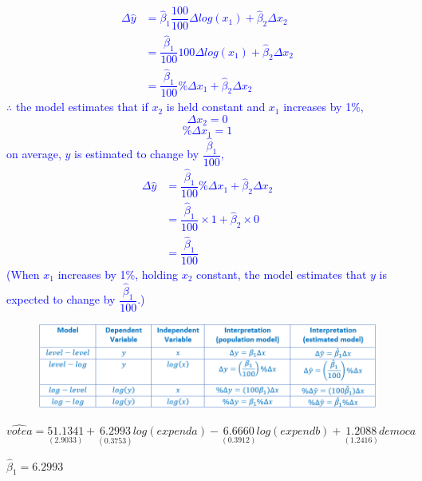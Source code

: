 \documentclass[12pt]{report}
\newenvironment{blueframed}[1][blue]
{\def\FrameCommand{\fboxsep=\FrameSep\fcolorbox{#1}{white}}%
	\MakeFramed {\advance\hsize-\width \FrameRestore}}
{\endMakeFramed}
\begin{document}
\justify
\begin{blueframed}
	\vspace{-\baselineskip}
	\justify
	\noindent \textcolor{blue}
	{
		\begin{align*}
			\Delta \hat{y} &= \hat{\beta}_1\dfrac{100}{100}\Delta log(x_1) + \hat{\beta}_2\Delta x_2 \\
			&= \dfrac{\hat{\beta}_1}{100} 100\Delta log(x_1) + \hat{\beta}_2\Delta x_2 \\
			&= \dfrac{\hat{\beta}_1}{100} \%\Delta x_1 + \hat{\beta}_2\Delta x_2
		\end{align*}
		$\therefore$ the model estimates that if $x_2$ is held constant and $x_1$ increases by 1\%, $$\Delta x_2 = 0$$ $$\% \Delta x_1 = 1$$ on average, $y$ is estimated to change by $\dfrac{\hat{\beta}_1}{100}$, \begin{align*}
			\Delta \hat{y} &= \dfrac{\hat{\beta}_1}{100} \%\Delta x_1 + \hat{\beta}_2\Delta x_2 \\
			&= \dfrac{\hat{\beta}_1}{100} \times 1 + \hat{\beta}_2 \times 0 \\
			&= \dfrac{\hat{\beta}_1}{100}
		\end{align*} (When $x_1$ increases by 1\%, holding $x_2$ constant, the model estimates that $y$ is expected to change by $\dfrac{\hat{\beta}_1}{100}$.)
	}
\end{blueframed}
\begin{figure}[H]
	\centerline{\includegraphics{tute7_q1_1}}
\end{figure}
\vspace{-\baselineskip}

\newpage
$$\widehat{votea} = \underset{(2.9033)}{51.1341} + \underset{(0.3753)}{6.2993}log(expenda) - \underset{(0.3912)}{6.6660}log(expendb) + \underset{(1.2416)}{1.2088}democa$$

\noindent $\hat{\beta}_1 = 6.2993$
\end{document}
